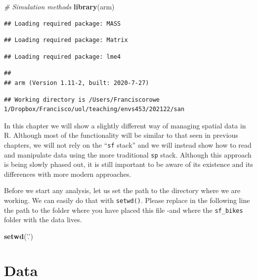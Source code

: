 \documentclass[
]{book}
\newenvironment{Shaded}{\begin{snugshade}}{\end{snugshade}}
\newcommand{\CommentTok}[1]{\textcolor[rgb]{0.56,0.35,0.01}{\textit{#1}}}
\newcommand{\KeywordTok}[1]{\textcolor[rgb]{0.13,0.29,0.53}{\textbf{#1}}}
\newcommand{\NormalTok}[1]{#1}
\newcommand{\StringTok}[1]{\textcolor[rgb]{0.31,0.60,0.02}{#1}}
\begin{document}
\begin{Shaded}
\begin{Highlighting}[]
\CommentTok{# Simulation methods}
\KeywordTok{library}\NormalTok{(arm)}
\end{Highlighting}
\end{Shaded}

\begin{verbatim}
## Loading required package: MASS
\end{verbatim}

\begin{verbatim}
## Loading required package: Matrix
\end{verbatim}

\begin{verbatim}
## Loading required package: lme4
\end{verbatim}

\begin{verbatim}
## 
## arm (Version 1.11-2, built: 2020-7-27)
\end{verbatim}

\begin{verbatim}
## Working directory is /Users/Franciscorowe 1/Dropbox/Francisco/uol/teaching/envs453/202122/san
\end{verbatim}

In this chapter we will show a slightly different way of managing spatial data in R. Although most of the functionality will be similar to that seen in previous chapters, we will not rely on the ``\texttt{sf} stack'' and we will instead show how to read and manipulate data using the more traditional \texttt{sp} stack. Although this approach is being slowly phased out, it is still important to be aware of its existence and its differences with more modern approaches.

Before we start any analysis, let us set the path to the directory where we are working. We can easily do that with \texttt{setwd()}. Please replace in the following line the path to the folder where you have placed this file -and where the \texttt{sf\_bikes} folder with the data lives.

\begin{Shaded}
\begin{Highlighting}[]
\KeywordTok{setwd}\NormalTok{(}\StringTok{'.'}\NormalTok{)}
\end{Highlighting}
\end{Shaded}

\hypertarget{data-1}{%
\section{Data}\label{data-1}}
\end{document}
